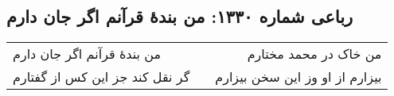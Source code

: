 \begin{center}
\section*{رباعی شماره ۱۳۳۰: من بندهٔ قرآنم اگر جان دارم}
\label{sec:1330}
\begin{longtable}{l p{0.5cm} r}
من بندهٔ قرآنم اگر جان دارم
&&
من خاک در محمد مختارم
\\
گر نقل کند جز این کس از گفتارم
&&
بیزارم از او وز این سخن بیزارم
\\
\end{longtable}
\end{center}
